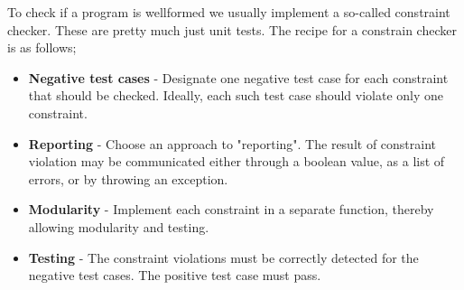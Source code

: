             To check if a program is wellformed we usually implement a so-called constraint checker. These are pretty much just unit tests.
            The recipe for a constrain checker is as follows;
            \begin{itemize}
                \item \textbf{Negative test cases} - Designate one negative test case for each constraint that should be checked. 
                Ideally, each such test case should violate only one constraint.
                \item \textbf{Reporting} - Choose an approach to "reporting". The result of constraint violation may be communicated either through
                                        a boolean value, as a list of errors, or by throwing an exception.
                \item \textbf{Modularity} - Implement each constraint in a separate function, thereby allowing modularity and testing.
                \item \textbf{Testing} - The constraint violations must be correctly detected for the negative test cases. The positive test case must pass.
            \end{itemize}

    